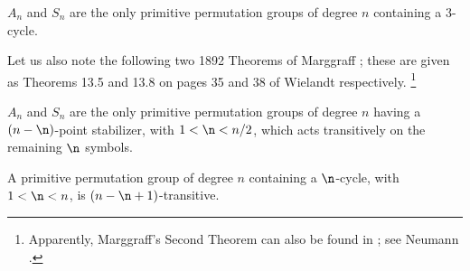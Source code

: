 $A_n$ and $S_n$ are the only primitive permutation groups 
of degree $n$ 
containing a $3$-cycle.
\endproclaim

Let us also note the following two  1892 Theorems of 
Marggraff \cite{Mar};
these are given as Theorems 13.5 and 13.8 on pages 35 and 
38 of Wielandt
\cite{Wi} respectively.
\footnote{Apparently, Marggraff's Second Theorem can also 
be found in
\cite{J2}; see Neumann \cite{N}.}

$A_n$ and $S_n$ are the only primitive permutation groups 
of degree $n$ 
having a $(n-\n)$-point stabilizer, with $1<\n<n/2$, which 
acts 
transitively on the remaining $\n$ symbols.
\endproclaim


A primitive permutation group of degree $n$ containing a 
$\n$-cycle,
with $1<\n<n$, is $(n-\n+1)$-transitive. 
\endproclaim

